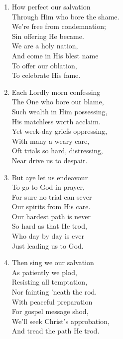 \documentclass[11pt,a4paper]{article}
\begin{document}
\begin{enumerate}
    \item How perfect our salvation \\
        Through Him who bore the shame. \\
        We're free from condemnation; \\
        Sin offering He became. \\
        We are a holy nation, \\
        And come in His blest name \\
        To offer our oblation, \\
        To celebrate His fame.

    \item Each Lordly morn confessing \\
        The One who bore our blame, \\
        Such wealth in Him possessing, \\
        His matchless worth acclaim. \\
        Yet week-day griefs oppressing, \\
        With many a weary care, \\
        Oft trials so hard, distressing, \\
        Near drive us to despair.

    \item But aye let us endeavour \\
        To go to God in prayer, \\
        For sure no trial can sever \\
        Our spirits from His care. \\
        Our hardest path is never \\
        So hard as that He trod, \\
        Who day by day is ever \\
        Just leading us to God.

    \item Then sing we our salvation \\
        As patiently we plod, \\
        Resisting all temptation, \\
        Nor fainting 'neath the rod. \\
        With peaceful preparation \\
        For gospel message shod, \\
        We'll seek Christ's approbation, \\
        And tread the path He trod.

\end{enumerate}
\end{document}
